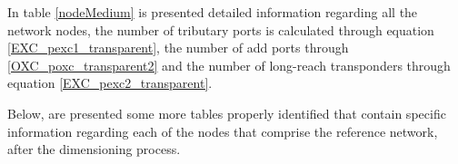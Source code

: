 In table \ref{nodeMedium} is presented detailed information regarding all the network nodes, the number of tributary ports is calculated through equation \ref{EXC_pexc1_transparent}, the number of add ports through \ref{OXC_poxc_transparent2} and the number of long-reach transponders through equation \ref{EXC_pexc2_transparent}.

\vspace{17pt}

\begin{table}[H]
\centering
{}
\caption{Node information for medium traffic scenario.}
\label{nodeMedium}
\end{table}

\vspace{11pt}

Below, are presented some more tables properly identified that contain specific information regarding each of the nodes that comprise the reference network, after the dimensioning process. %


